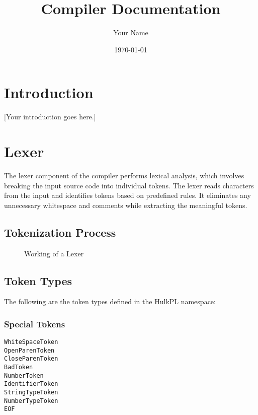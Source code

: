 \documentclass{article}
\begin{document}
\title{Compiler Documentation}
\author{Your Name}
\date{\today}

\maketitle
\newpage
\tableofcontents
\newpage

\section{Introduction}

[Your introduction goes here.]

\newpage

\section{Lexer}

The lexer component of the compiler performs lexical analysis, which involves breaking the input source code into individual tokens. The lexer reads characters from the input and identifies tokens based on predefined rules. It eliminates any unnecessary whitespace and comments while extracting the meaningful tokens.

\subsection{Tokenization Process}

\begin{figure}[H]
\centering
{}
\caption{Working of a Lexer}
\end{figure}

\subsection{Token Types}
The following are the token types defined in the HulkPL namespace:
\subsubsection{Special Tokens}
\begin{lstlisting}
WhiteSpaceToken
OpenParenToken
CloseParenToken
BadToken
NumberToken
IdentifierToken
StringTypeToken
NumberTypeToken
EOF
\end{lstlisting}
\end{document}
